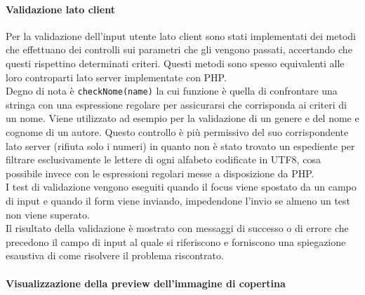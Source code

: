 \documentclass[12pt,a4paper,headings=optiontohead]{article}
\begin{document}
	\paragraph{Validazione lato client}
	Per la validazione dell'input utente lato client sono stati implementati dei metodi che effettuano dei controlli sui parametri che gli vengono passati, accertando che questi rispettino determinati criteri. Questi metodi sono spesso equivalenti alle loro controparti lato server implementate con PHP. \\
	Degno di nota è \texttt{checkNome(name)} la cui funzione è quella di confrontare una stringa con una espressione regolare per assicurarsi che corrisponda ai criteri di un nome. Viene utilizzato ad esempio per la validazione di un genere e del nome e cognome di un autore. Questo controllo è più permissivo del suo corrispondente lato server (rifiuta solo i numeri) in quanto non è stato trovato un espediente per filtrare esclusivamente le lettere di ogni alfabeto codificate in UTF8, cosa possibile invece con le espressioni regolari messe a disposizione da PHP.\\
	I test di validazione vengono eseguiti quando il focus viene spostato da un campo di input e quando il form viene inviando, impedendone l'invio se almeno un test non viene superato.\\
	Il risultato della validazione è mostrato con messaggi di successo o di errore che precedono il campo di input al quale si riferiscono e forniscono una spiegazione esaustiva di come risolvere il problema riscontrato.
	
	\paragraph{Visualizzazione della preview dell'immagine di copertina} %
	
\end{document}
